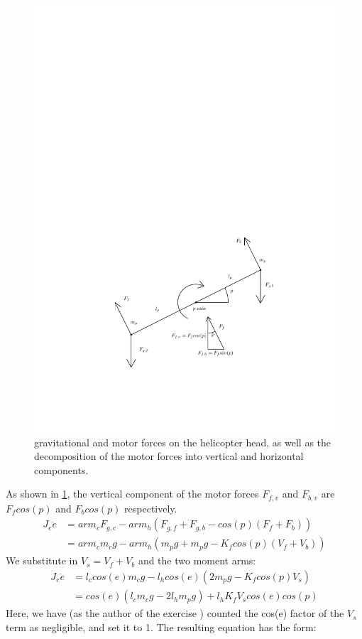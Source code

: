 \begin{figure}[H]
  \caption{gravitational and motor forces on the helicopter head, as well as the decomposition of the motor forces into vertical and horizontal components.}
  \label{fig:pitch_model}
  \includegraphics[width=1\textwidth]{images/pitch_model}
\end{figure}
\newpage
As shown in \cref{fig:pitch_model}, the vertical component of the motor forces $F_{f,v}$ and $F_{b,v}$ are $F_fcos(p)$ and $F_bcos(p)$ respectively.
\begin{align*}
J_e\ddot{e} &= arm_cF_{g,c} - arm_h(F_{g,f}+F_{g,b} - cos(p)(F_f + F_b)) \\
						&= arm_cm_cg - arm_h(m_pg + m_pg - K_fcos(p)(V_f + V_b))
\end{align*}
We substitute in $V_s = V_f + V_b$ and the two moment arms:
\begin{align*}
  J_e\ddot{e} &= l_ccos(e)m_cg - l_hcos(e)(2m_pg - K_fcos(p)V_s) \\
              &= cos(e)(l_cm_cg - 2l_hm_pg) + l_hK_fV_scos(e)cos(p)
\end{align*}
Here, we have (as the author of the exercise \cite{assignment}) counted the cos(e)
factor of the $V_s$ term as negligible, and set it to 1. The resulting equation has the form:

